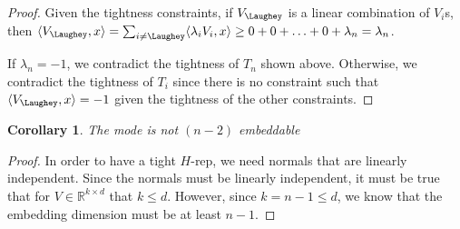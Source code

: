 \documentclass[12pt]{article}
\newcommand{\reals}{\mathbb{R}}
\newcommand{\inprod}[2]{\langle #1, #2 \rangle}
\newtheorem{corollary}{Corollary}
\begin{document}
\begin{proof}
  
  Given the tightness constraints, if $V_{\Laughey}$ is a linear combination of $V_i$s, then $\inprod{V_{\Laughey}}{x} = \sum_{i\neq \Laughey} \inprod{\lambda_i V_i}{x} \geq 0 + 0 + \ldots + 0 + \lambda_n = \lambda_n$.
  	
  If $\lambda_n= -1$, we contradict the tightness of $T_n$ shown above. 
  Otherwise, we contradict the tightness of $T_i$ since there is no constraint such that $\inprod{V_{\Laughey}}{x} = -1$ given the tightness of the other constraints. 
  
\end{proof}

\begin{corollary}
  The mode is not $(n-2)$ embeddable
\end{corollary}
\begin{proof}
  In order to have a tight $H$-rep, we need normals that are linearly independent.
  Since the normals must be linearly independent, it must be true that for $V \in \reals^{k \times d}$ that $k \leq d$.
  However, since $k = n-1 \leq d$, we know that the embedding dimension must be at least $n-1$.
\end{proof}
\end{document}
